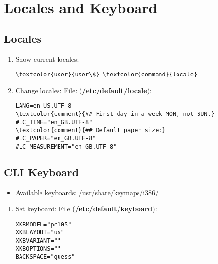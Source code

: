 \documentclass[10pt, a4paper, onecolumn, openany]{book} %
\begin{document}
\section{Locales and Keyboard}
\subsection{Locales}
\begin{enumerate}
    \item Show current locales:
\begin{Verbatim}[commandchars=\\\{\}]
\textcolor{user}{user\$} \textcolor{command}{locale}
\end{Verbatim}
    \item Change locales:
\newline File: (\textbf{\textcolor{file}{/etc/default/locale}}):
\begin{Verbatim}[commandchars=\\\{\}]
LANG=en_US.UTF-8
\textcolor{comment}{## First day in a week MON, not SUN:}
#LC_TIME="en_GB.UTF-8"
\textcolor{comment}{## Default paper size:}
#LC_PAPER="en_GB.UTF-8"
#LC_MEASUREMENT="en_GB.UTF-8"
\end{Verbatim}
\end{enumerate}
\subsection{CLI Keyboard}
\begin{itemize}
    \item Available keyboards: \textcolor{dir}{/usr/share/keymaps/i386/}
\end{itemize}
\begin{enumerate}
    \item Set keyboard:
\newline File (\textbf{\textcolor{file}{/etc/default/keyboard}}):
\begin{Verbatim}[commandchars=\\\{\}]
XKBMODEL="pc105"
XKBLAYOUT="us"
XKBVARIANT=""
XKBOPTIONS=""
BACKSPACE="guess"
\end{Verbatim}
\end{enumerate}
\end{document}
